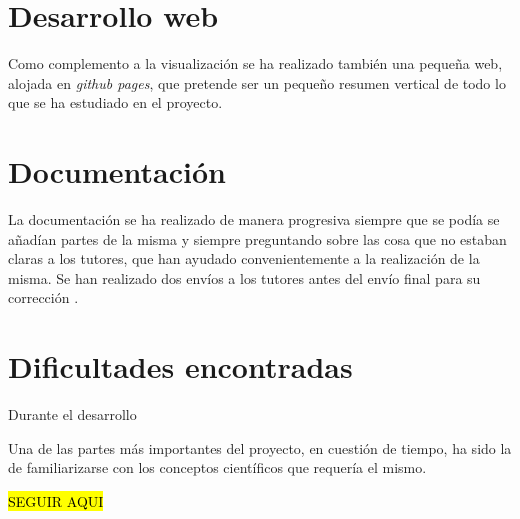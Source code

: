 \section{Desarrollo web}\label{dweb}

Como complemento a la visualización se ha realizado también una pequeña web, alojada en \textit{github pages}, que pretende ser un pequeño resumen vertical de todo lo que se ha estudiado en el proyecto.

\section{Documentación}\label{docs}

La documentación se ha realizado de manera progresiva siempre que se podía se añadían partes de la misma y siempre preguntando sobre las cosa que no estaban claras a los tutores, que han ayudado convenientemente a la realización de la misma. Se han realizado dos envíos a los tutores antes del envío final para su corrección .

\section{Dificultades encontradas}\label{inicio-proyecto}

Durante el desarrollo 

Una de las partes más importantes del proyecto, en cuestión de tiempo, ha sido la de familiarizarse con los conceptos científicos que requería el mismo. 

 \hl{SEGUIR AQUI}


